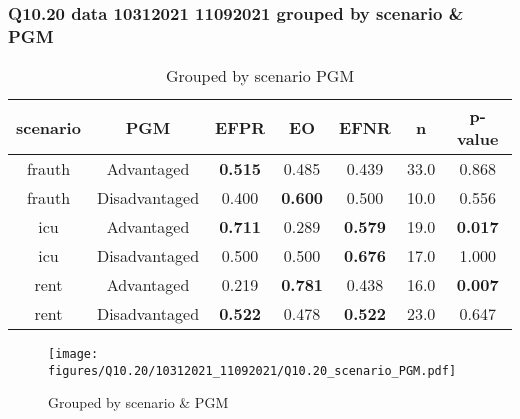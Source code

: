 \subsubsection{Q10.20 data 10312021 11092021 grouped by scenario \& PGM}

\begin{comment}
                             EFPR        EO      EFNR     n    pvalue
(frauth, Advantaged)     0.515152  0.484848  0.439394  33.0  0.868044
(frauth, Disadvantaged)  0.400000  0.600000  0.500000  10.0  0.556267
(icu, Advantaged)        0.710526  0.289474  0.578947  19.0  0.016855
(icu, Disadvantaged)     0.500000  0.500000  0.676471  17.0  1.000000
(rent, Advantaged)       0.218750  0.781250  0.437500  16.0  0.006561
(rent, Disadvantaged)    0.521739  0.478261  0.521739  23.0  0.646777
\end{comment}

\begin{table}[h]
    \centering
    \begin{tabular}{|c|c|c|c|c|c|c|}
        \hline
        scenario & PGM & EFPR & EO & EFNR & n & p-value\\
        \hline
        frauth & Advantaged & \textbf{0.515} & 0.485 & 0.439 & 33.0 & 0.868\\
		frauth & Disadvantaged & 0.400 & \textbf{0.600} & 0.500 & 10.0 & 0.556\\
		icu & Advantaged & \textbf{0.711} & 0.289 & \textbf{0.579} & 19.0 & \textbf{0.017}\\
		icu & Disadvantaged & 0.500 & 0.500 & \textbf{0.676} & 17.0 & 1.000\\
		rent & Advantaged & 0.219 & \textbf{0.781} & 0.438 & 16.0 & \textbf{0.007}\\
		rent & Disadvantaged & \textbf{0.522} & 0.478 & \textbf{0.522} & 23.0 & 0.647\\
		
        \hline
    \end{tabular}
    \caption{Grouped by scenario PGM}
    \label{tab:my_label}
\end{table}
\begin{figure}[h]
    \centering
    \texttt{[image: figures/Q10.20/10312021\_11092021/Q10.20\_scenario\_PGM.pdf]}
    \caption{Grouped by scenario \& PGM}
    \label{fig:my_label}
\end{figure}
